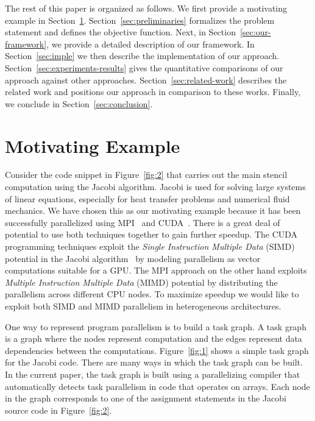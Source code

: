 The rest of this paper is organized as follows. We first provide a
motivating example in
Section~\ref{sec:motivating-example}. Section~\ref{sec:preliminaries}
formalizes the problem statement and defines the objective
function. Next, in Section~\ref{sec:our-framework}, we provide a
detailed description of our framework. In Section~\ref{sec:imple} we
then describe the implementation of our
approach. Section~\ref{sec:experiments-results} gives the quantitative
comparisons of our approach against other
approaches. Section~\ref{sec:related-work} describes the related work
and positions our approach in comparison to these works.  Finally, we
conclude in Section~\ref{sec:conclusion}.

\section{Motivating Example}
\label{sec:motivating-example}
Consider the code snippet in Figure~\ref{fig:2} that carries out the
main stencil computation using the Jacobi algorithm. Jacobi is used
for solving large systems of linear equations, especially for heat
transfer problems and numerical fluid mechanics. We have chosen this
as our motivating example because it has been successfully
parallelized using MPI~\cite{jacobi1} and CUDA~\cite{jacobi2}.  There
is a great deal of potential to use both techniques together to gain
further speedup. The CUDA programming techniques exploit the
\textit{Single Instruction Multiple Data} (SIMD) potential in the
Jacobi algorithm~\cite{jacobi2} by modeling parallelism as vector
computations suitable for a GPU. The MPI approach on the other hand
exploits \textit{Multiple Instruction Multiple Data} (MIMD) potential
by distributing the parallelism across different CPU nodes. To
maximize speedup we would like to exploit both SIMD and MIMD
parallelism in heterogeneous architectures.

One way to represent program parallelism is to build a task graph.  A
task graph is a graph where the nodes represent computation and the
edges represent data dependencies between the computations.
Figure~\ref{fig:1} shows a simple task graph for the Jacobi code. There
are many ways in which the task graph can be built. In the current
paper, the task graph is built using a parallelizing compiler that
automatically detects task parallelism in code that operates on
arrays. Each node in the graph corresponds to one of the assignment
statements in the Jacobi source code in Figure~\ref{fig:2}.

